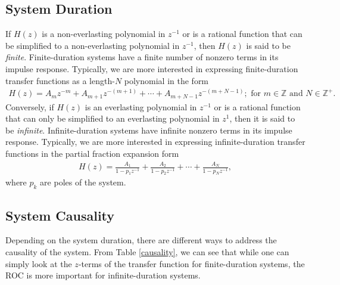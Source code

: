 \documentclass{report}
\begin{document}
\subsection{System Duration}
If $H(z)$ is a non-everlasting polynomial in $z^{-1}$ or is a rational function that can be simplified to a non-everlasting polynomial in $z^{-1}$, 
then $H(z)$ is said to be \emph{finite}. Finite-duration systems have a finite number of nonzero terms in its impulse response. Typically, we are more 
interested in expressing finite-duration transfer functions as a length-$N$ polynomial in the form
\begin{align}
    H(z) = A_mz^{-m} + A_{m+1}z^{-(m+1)} + \cdots + A_{m+N-1}z^{-(m+N-1)}; \text{ for } m\in\mathbb{Z} \text{ and } N\in\mathbb{Z}^+.
\end{align}
Conversely, if $H(z)$ is an everlasting polynomial in $z^{-1}$ or is a rational function that can only be simplified to an everlasting polynomial in $z^{1}$, 
then it is said to be \emph{infinite}. Infinite-duration systems have infinite nonzero terms in its impulse response. Typically, we are more interested in expressing 
infinite-duration transfer functions in the partial fraction expansion form 
\begin{align}
    H(z) = \frac{A_1}{1-p_1z^{-1}} + \frac{A_2}{1-p_2z^{-1}} + \cdots + \frac{A_N}{1-p_Nz^{-1}},
\end{align}
where $p_k$ are poles of the system.

\subsection{System Causality}
Depending on the system duration, there are different ways to address the causality of the system. From Table \ref{causality}, we can see that while one can simply 
look at the $z$-terms of the transfer function for finite-duration systems, the ROC is more important for infinite-duration systems.
\end{document}
